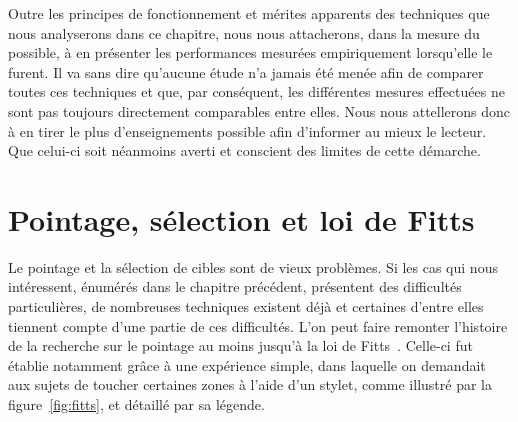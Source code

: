 	Outre les principes de fonctionnement et mérites apparents des techniques que nous analyserons dans ce chapitre, nous nous attacherons, dans la mesure du possible, à en présenter les performances mesurées empiriquement lorsqu'elle le furent. Il va sans dire qu'aucune étude n'a jamais été menée afin de comparer toutes ces techniques et que, par conséquent, les différentes mesures effectuées ne sont pas toujours directement comparables entre elles. Nous nous attellerons donc à en tirer le plus d'enseignements possible afin d'informer au mieux le lecteur. Que celui-ci soit néanmoins averti et conscient des limites de cette démarche.

\section{Pointage, sélection et loi de Fitts}
	Le pointage et la sélection de cibles sont de vieux problèmes. Si les cas qui nous intéressent, énumérés dans le chapitre précédent, présentent des difficultés particulières, de nombreuses techniques existent déjà et certaines d'entre elles tiennent compte d'une partie de ces difficultés. L'on peut faire remonter l'histoire de la recherche sur le pointage au moins jusqu'à la loi de Fitts~\cite{fitts1954information}. Celle-ci fut établie notamment grâce à une expérience simple, dans laquelle on demandait aux sujets de toucher certaines zones à l'aide d'un stylet, comme illustré par la figure~\ref{fig:fitts}, et détaillé par sa légende.
	
